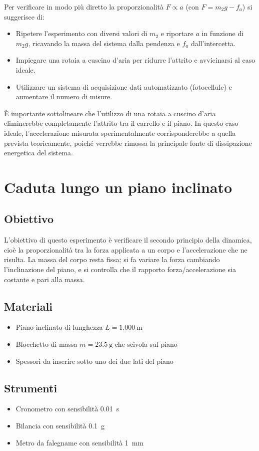 Per verificare in modo più diretto la proporzionalità $F \propto a$ (con $F = m_2 g - f_a$) si suggerisce di:
\begin{itemize}
    \item Ripetere l'esperimento con diversi valori di $m_2$ e riportare $a$ in funzione di $m_2 g$, ricavando la massa del sistema dalla pendenza e $f_a$ dall'intercetta.
    \item Impiegare una rotaia a cuscino d'aria per ridurre l'attrito e avvicinarsi al caso ideale.
    \item Utilizzare un sistema di acquisizione dati automatizzato (fotocellule) e aumentare il numero di misure.
\end{itemize}

È importante sottolineare che l'utilizzo di una rotaia a cuscino d'aria eliminerebbe completamente l'attrito tra il carrello e il piano. In questo caso ideale, l'accelerazione misurata sperimentalmente corrisponderebbe a quella prevista teoricamente, poiché verrebbe rimossa la principale fonte di dissipazione energetica del sistema.
\section{Caduta lungo un piano inclinato}
\subsection{Obiettivo}
L'obiettivo di questo esperimento è verificare il secondo principio della dinamica, cioè la proporzionalità tra la forza applicata a un corpo e l'accelerazione che ne risulta. La massa del corpo resta fissa; si fa variare la forza cambiando l'inclinazione del piano, e si controlla che il rapporto forza/accelerazione sia costante e pari alla massa.

\subsection{Materiali}
\begin{itemize}
    \item Piano inclinato di lunghezza $L = \SI{1,000}{\meter}$
    \item Blocchetto di massa $m = \SI{23,5}{\gram}$ che scivola sul piano
    \item Spessori da inserire sotto uno dei due lati del piano
\end{itemize}

\subsection{Strumenti}
\begin{itemize}
    \item Cronometro con sensibilità \SI{0,01}{\second}
    \item Bilancia con sensibilità \SI{0,1}{\gram}
    \item Metro da falegname con sensibilità \SI{1}{\milli\meter}
\end{itemize}


